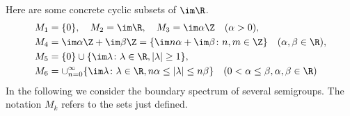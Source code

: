 	Here are some concrete cyclic subsets of\/ $\im \R$.
	\begin{align*}
		M_{1} &= \{0\}, \quad M_{2} = \im\R, \quad M_{3} = \im\alpha\Z \quad (\alpha > 0), \\
		M_{4} &= \im\alpha\Z + \im\beta\Z = \{\im n\alpha +  \im\beta \colon n,m \in \Z\} \quad (\alpha, \beta \in \R), \\
		M_{5} &= \{0\} \cup \{\im \lambda \colon \lambda \in \R, |\lambda| \geq 1\}, \\
		M_{6} &= \cup_{n=0}^{\infty}\{\im \lambda \colon \lambda \in \R, n\alpha \leq |\lambda| \leq n\beta\} \quad (0 < \alpha \leq \beta, \alpha,\beta \in \R)
	\end{align*}
	In the following we consider the boundary spectrum of several semigroups. 
    The notation $M_{k}$ refers to the sets just defined.
